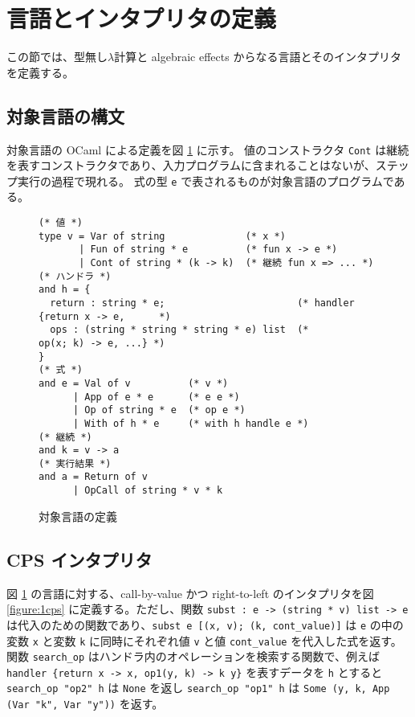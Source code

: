 \section{言語とインタプリタの定義}
\label{section:definition}

この節では、型無し$\lambda$計算と algebraic effects からなる言語とそのインタプリタを定義する。

\subsection{対象言語の構文}
\label{subsection:syntax}

対象言語の OCaml による定義を図 \ref{figure:syntax} に示す。
値のコンストラクタ \texttt{Cont} は継続を表すコンストラクタであり、入力プログラムに含まれることはないが、ステップ実行の過程で現れる。
式の型 \texttt{e} で表されるものが対象言語のプログラムである。

\begin{figure}
\begin{verbatim}
(* 値 *)
type v = Var of string              (* x *)
       | Fun of string * e          (* fun x -> e *)
       | Cont of string * (k -> k)  (* 継続 fun x => ... *)
(* ハンドラ *)
and h = {
  return : string * e;                       (* handler {return x -> e,      *)
  ops : (string * string * string * e) list  (*          op(x; k) -> e, ...} *)
}
(* 式 *)
and e = Val of v          (* v *)
      | App of e * e      (* e e *)
      | Op of string * e  (* op e *)
      | With of h * e     (* with h handle e *)
(* 継続 *)
and k = v -> a
(* 実行結果 *)
and a = Return of v
      | OpCall of string * v * k

\end{verbatim}
\caption{対象言語の定義}
\label{figure:syntax}
\end{figure}

\subsection{CPS インタプリタ}

図 \ref{figure:syntax} の言語に対する、call-by-value かつ right-to-left のインタプリタを図 \ref{figure:1cps} に定義する。ただし、関数 \texttt{subst :\ e -> (string * v) list -> e} は代入のための関数であり、\texttt{subst e [(x, v); (k, cont\_value)]} は \texttt{e} の中の変数 \texttt{x} と変数 \texttt{k} に同時にそれぞれ値 \texttt{v} と値 \texttt{cont\_value} を代入した式を返す。関数 \texttt{search\_op} はハンドラ内のオペレーションを検索する関数で、例えば \texttt{handler \{return x -> x, op1(y, k) -> k y\}} を表すデータを \texttt{h} とすると \texttt{search\_op "op2" h} は \texttt{None} を返し \texttt{search\_op "op1" h} は \texttt{Some (y, k, App (Var "k", Var "y"))} を返す。

